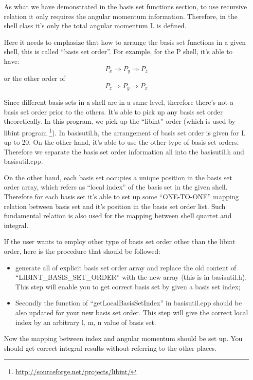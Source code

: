 As what we have demonstrated in the basis set functions section, to use
recursive relation it only requires the angular momentum information. 
Therefore, in the shell class it's only the total angular momentum L
is defined.

Here it needs to emphasize that how to arrange the basis set
functions in a given shell, this is called ``basis set order''.
For example, for the P shell, it's able to have:
\begin{equation}
 P_{x} \Rightarrow P_{y} \Rightarrow P_{z}
\end{equation} 
or the other order of 
\begin{equation}
 P_{z} \Rightarrow P_{y} \Rightarrow P_{x}
\end{equation} 

Since different basis sets in a shell are in a same level, therefore
there's not a basis set order prior to the others. It's able to 
pick up any basis set order theoretically. In this program, we 
pick up the ``libint'' order (which is used by libint program
\footnote{\url{http://sourceforge.net/projects/libint/}}). 
In basisutil.h, the arrangement of basis set order is given for 
L up to 20. On the other hand, it's able to use the other 
type of basis set orders. Therefore we separate the basis set 
order information all into the basisutil.h and basisutil.cpp.

On the other hand, each basis set occupies a unique position in the 
basis set order array, which refers as ``local index'' of the 
basis set in the given shell. Therefore for 
each basis set it's able to set up some ``ONE-TO-ONE'' mapping 
relation between basis set and it's position in the basis set 
order list. Such fundamental relation is also used for the 
mapping between shell quartet and integral.

If the user wants to employ other type of basis set order other 
than the libint order, here is the procedure that should be 
followed:
\begin{itemize}
 \item generate all of explicit basis set order array and 
	 replace the old content of ``LIBINT\_BASIS\_SET\_ORDER''
	 with the new array (this is in basisutil.h). This step
	 will enable you to get correct basis set by given 
	 a basis set index;
 \item Secondly the function of ``getLocalBasisSetIndex'' in
	 basisutil.cpp should be also updated for your new basis 
	 set order. This step will give the correct local index
	 by an arbitrary l, m, n value of basis set.
\end{itemize}
Now the mapping between index and angular momentum should be 
set up. You should get correct integral results without 
referring to the other places.

